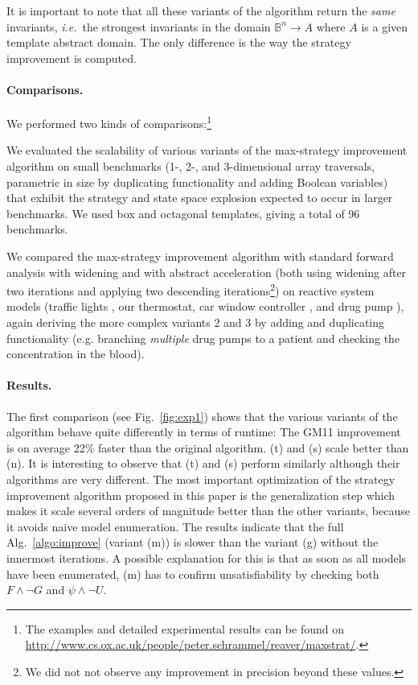 \documentclass{llncs}
\newcommand{\BB}{\mathbb{B}}
\newcommand{\ie}{\textit{i.e.}}
\begin{document}
It is important to note that all these variants of the algorithm
return the \emph{same} invariants, \ie~the strongest invariants in the
domain $\BB^n \rightarrow A$ where $A$ is a given template abstract
domain. The only difference is the way the strategy improvement is
computed.

\paragraph{Comparisons.}
We performed two kinds of comparisons:\footnote{The examples and
  detailed experimental results can be found on
  \url{http://www.cs.ox.ac.uk/people/peter.schrammel/reaver/maxstrat/}.} 

\begin{compactenum} 
\item We evaluated the scalability of various variants of the
  max-strategy improvement algorithm on small benchmarks (1-, 2-, and
  3-dimensional array traversals, parametric in size by duplicating
  functionality and adding Boolean variables) that exhibit the
  strategy and state space explosion expected to occur in larger
  benchmarks. We used box and octagonal templates, giving a total of
  96 benchmarks. 
\item We compared the max-strategy improvement algorithm with standard
  forward analysis with widening and with abstract acceleration
  \cite{GH06,SJ12c} (both using widening after two iterations and
  applying two descending iterations\footnote{We did not not observe
    any improvement in precision beyond these values.}) on reactive
  system models (traffic lights \cite{BKA08}, our thermostat, car
  window controller \cite{SMK13a}, and drug pump \cite{SHL11}), again
  deriving the more complex variants 2 and 3 by adding and duplicating
  functionality (e.g. branching \emph{multiple} drug pumps to a
  patient and checking the concentration in the blood). 
\end{compactenum}

\paragraph{Results.}
The first comparison (see Fig.~\ref{fig:exp1}) shows that
the various variants of the algorithm behave quite differently in
terms of runtime:
The GM11 improvement is on average 22\% faster than the original
algorithm.
(t) and (s) scale better than (n). It is interesting to observe that
(t) and (s) perform similarly although their algorithms are very
different.
The most important optimization of the strategy improvement algorithm
proposed in this paper is the generalization step which makes it scale
several orders of magnitude better than the other variants,
because it avoids naive model enumeration.
The results indicate that the full Alg.~\ref{algo:improve}
(variant (m)) is slower than the variant (g) without the innermost
iterations. A possible explanation for this is that as soon as all
models have been enumerated, (m) has to confirm 
unsatisfiability by checking both $F\wedge\neg G$ and $\psi\wedge\neg U$.
\end{document}
